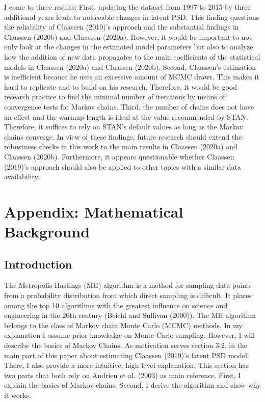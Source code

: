 \documentclass[12pt,english,a4paper,oneside]{article}
\theoremstyle{definition}
\theoremstyle{definition}
\theoremstyle{definition}
\theoremstyle{definition}
\theoremstyle{remark}
\begin{document}
I come to three results:
First, updating the dataset from 1997 to 2015 by three additional years leads to noticeable changes in latent PSD. This finding questions the reliability of Claassen (2019)'s approach and the substantial findings in Claassen (2020b) and Claassen (2020a). However, it would be important to not only look at the changes in the estimated model parameters but also to analyze how the addition of new data propagates to the main coefficients of the statistical models in Claassen (2020a) and Claassen (2020b).
Second, Claassen's estimation is inefficient because he uses an excessive amount of MCMC draws. This makes it hard to replicate and to build on his research. Therefore, it would be good research practice to find the minimal number of iterations by means of convergence tests for Markov chains.
Third, the number of chains does not have an effect and the warmup length is ideal at the value recommended by STAN. Therefore, it suffices to rely on STAN's default values as long as the Markov chains converge. In view of these findings, future research should extend the robustness checks in this work to the main results in Claassen (2020a) and Claassen (2020b). Furthermore, it appears questionable whether Claassen (2019)'s approach should also be applied to other topics with a similar data availability.

\hypertarget{appendix-mathematical-background}{%
\section{Appendix: Mathematical Background}\label{appendix-mathematical-background}}

\hypertarget{introduction-1}{%
\subsection{Introduction}\label{introduction-1}}

The Metropolis-Hastings (MH) algorithm is a method for sampling data points from a probability distribution from which direct sampling is difficult. It places among the top 10 algorithms with the greatest influence on science and engineering in the 20th century (Beichl and Sullivan (2000)). The MH algorithm belongs to the class of Markov chain Monte Carlo (MCMC) methods. In my explanation I assume prior knowledge on Monte Carlo sampling. However, I will describe the basics of Markov Chains. As motivation serves section 3.2. in the main part of this paper about estimating Claassen (2019)'s latent PSD model. There, I also provide a more intuitive, high-level explanation. This section has two parts that both rely on Andrieu et al. (2003) as main reference. First, I explain the basics of Markov chains. Second, I derive the algorithm and show why it works.
\end{document}
